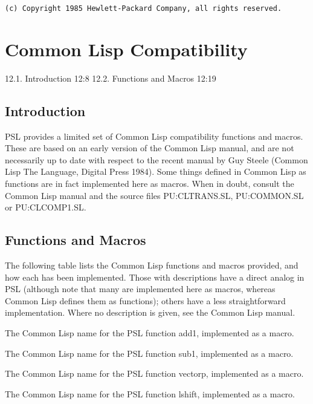 \begin{verbatim}
(c) Copyright 1985 Hewlett-Packard Company, all rights reserved.
\end{verbatim}

\section{Common Lisp Compatibility}

   12.1. Introduction                                       12:8
   12.2. Functions and Macros                              12:19

\subsection{Introduction}

  PSL  provides  a  limited  set  of  Common  Lisp compatibility
functions and macros.  These are based on an  early  version  of
the  Common Lisp manual, and are not necessarily up to date with
respect to the recent manual by Guy Steele  (Common  Lisp    The
Language,  Digital  Press  1984).  Some things defined in Common
Lisp as functions are in fact implemented here as macros.   When
in  doubt,  consult  the Common Lisp manual and the source files
PU:CLTRANS.SL, PU:COMMON.SL or PU:CLCOMP1.SL.

\subsection{Functions and Macros}

  The following table lists the Common Lisp functions and macros
provided,  and  how  each  has  been  implemented.   Those  with
descriptions  have  a  direct  analog in PSL (although note that
many are implemented here as macros, whereas Common Lisp defines
them  as  functions);  others  have   a   less   straightforward
implementation.   Where  no description is given, see the Common
Lisp manual.


{    The Common Lisp name for the PSL function add1,  implemented
    as a macro.
}

{    The  Common Lisp name for the PSL function sub1, implemented
    as a macro.
}

{    The  Common  Lisp  name  for  the  PSL   function   vectorp,
    implemented as a macro.
}

{    The   Common   Lisp   name  for  the  PSL  function  lshift,
    implemented as a macro.
}

